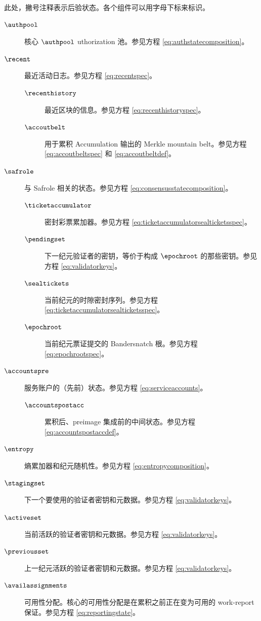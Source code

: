 此处，撇号注释表示后验状态。各个组件可以用字母下标来标识。
\begin{description}
  \item[$\authpool$] 核心 $\authpool$ uthorization 池。参见方程 \ref{eq:authstatecomposition}。
  \item[$\recent$] 最近活动日志。参见方程 \ref{eq:recentspec}。
  \begin{description}
    \item[$\recenthistory$] 最近区块的信息。参见方程 \ref{eq:recenthistoryspec}。
    \item[$\accoutbelt$] 用于累积 Accumulation 输出的 Merkle mountain belt。参见方程 \ref{eq:accoutbeltspec} 和 \ref{eq:accoutbeltdef}。
  \end{description}
  \item[$\safrole$] 与 Safrole 相关的状态。参见方程 \ref{eq:consensusstatecomposition}。
  \begin{description}
    \item[$\ticketaccumulator$] 密封彩票累加器。参见方程 \ref{eq:ticketaccumulatorsealticketsspec}。
    \item[$\pendingset$] 下一纪元验证者的密钥，等价于构成 $\epochroot$ 的那些密钥。参见方程 \ref{eq:validatorkeys}。
    \item[$\sealtickets$] 当前纪元的时隙密封序列。参见方程 \ref{eq:ticketaccumulatorsealticketsspec}。
    \item[$\epochroot$] 当前纪元票证提交的 Bandersnatch 根。参见方程 \ref{eq:epochrootspec}。
  \end{description}
  \item[$\accountspre$] 服务账户的（先前）状态。参见方程 \ref{eq:serviceaccounts}。
  \begin{description}
    \item[$\accountspostacc$] 累积后、preimage 集成前的中间状态。参见方程 \ref{eq:accountspostaccdef}。
  \end{description}
  \item[$\entropy$] 熵累加器和纪元随机性。参见方程 \ref{eq:entropycomposition}。
  \item[$\stagingset$] 下一个要使用的验证者密钥和元数据。参见方程 \ref{eq:validatorkeys}。
  \item[$\activeset$] 当前活跃的验证者密钥和元数据。参见方程 \ref{eq:validatorkeys}。
  \item[$\previousset$] 上一纪元活跃的验证者密钥和元数据。参见方程 \ref{eq:validatorkeys}。
  \item[$\availassignments$] 可用性分配。核心的可用性分配是在累积之前正在变为可用的 work-report 保证。参见方程 \ref{eq:reportingstate}。

\end{description}
